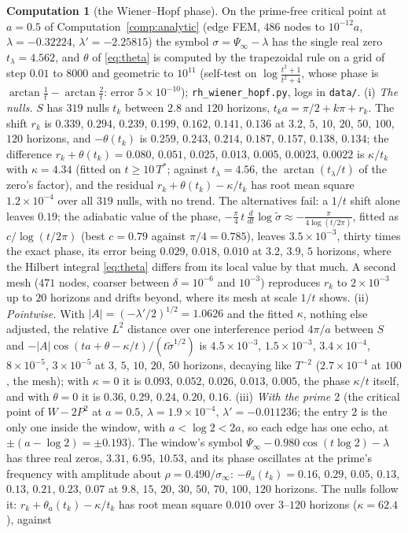 \documentclass[11pt]{article}
\theoremstyle{definition}
\newtheorem{computation}[theorem]{Computation}
\theoremstyle{remark}
\newcommand{\Tst}{T^{*}}
\begin{document}
\begin{computation}[the Wiener--Hopf phase]\label{comp:whphase}
On the prime-free critical point at $a=0.5$ of Computation~\ref{comp:analytic} (edge FEM, $486$ nodes to $10^{-12}a$, $\lambda=-0.32224$, $\lambda'=-2.25815$) the symbol $\sigma=\Psi_\infty-\lambda$ has the single real zero $t_\lambda=4.562$, and $\theta$ of \eqref{eq:theta} is computed by the trapezoidal rule on a grid of step $0.01$ to $8000$ and geometric to $10^{11}$ (self-test on $\log\frac{t^2+1}{t^2+4}$, whose phase is $\arctan\frac1t-\arctan\frac2t$: error $5\times10^{-10}$); \texttt{rh\_wiener\_hopf.py}, logs in \texttt{data/}. (i) \emph{The nulls.} $S$ has $319$ nulls $t_k$ between $2.8$ and $120$ horizons, $t_ka=\pi/2+k\pi+r_k$. The shift $r_k$ is $0.339$, $0.294$, $0.239$, $0.199$, $0.162$, $0.141$, $0.136$ at $3.2$, $5$, $10$, $20$, $50$, $100$, $120$ horizons, and $-\theta(t_k)$ is $0.259$, $0.243$, $0.214$, $0.187$, $0.157$, $0.138$, $0.134$; the difference $r_k+\theta(t_k)=0.080$, $0.051$, $0.025$, $0.013$, $0.005$, $0.0023$, $0.0022$ is $\kappa/t_k$ with $\kappa=4.34$ (fitted on $t\ge10\,\Tst$; against $t_\lambda=4.56$, the $\arctan(t_\lambda/t)$ of the zero's factor), and the residual $r_k+\theta(t_k)-\kappa/t_k$ has root mean square $1.2\times10^{-4}$ over all $319$ nulls, with no trend. The alternatives fail: a $1/t$ shift alone leaves $0.19$; the adiabatic value of the phase, $-\frac\pi4\,t\,\frac{d}{dt}\log\tilde\sigma\approx-\frac{\pi}{4\log(t/2\pi)}$, fitted as $c/\log(t/2\pi)$ (best $c=0.79$ against $\pi/4=0.785$), leaves $3.5\times10^{-3}$, thirty times the exact phase, its error being $0.029$, $0.018$, $0.010$ at $3.2$, $3.9$, $5$ horizons, where the Hilbert integral \eqref{eq:theta} differs from its local value by that much. A second mesh ($471$ nodes, coarser between $\delta=10^{-6}$ and $10^{-3}$) reproduces $r_k$ to $2\times10^{-3}$ up to $20$ horizons and drifts beyond, where its mesh at scale $1/t$ shows. (ii) \emph{Pointwise.} With $|A|=(-\lambda'/2)^{1/2}=1.0626$ and the fitted $\kappa$, nothing else adjusted, the relative $L^2$ distance over one interference period $4\pi/a$ between $S$ and $-|A|\cos(ta+\theta-\kappa/t)/(t\tilde\sigma^{1/2})$ is $4.5\times10^{-3}$, $1.5\times10^{-3}$, $3.4\times10^{-4}$, $8\times10^{-5}$, $3\times10^{-5}$ at $3$, $5$, $10$, $20$, $50$ horizons, decaying like $T^{-2}$ ($2.7\times10^{-4}$ at $100$, the mesh); with $\kappa=0$ it is $0.093$, $0.052$, $0.026$, $0.013$, $0.005$, the phase $\kappa/t$ itself, and with $\theta=0$ it is $0.36$, $0.29$, $0.24$, $0.20$, $0.16$. (iii) \emph{With the prime $2$} (the critical point of $W-2P^2$ at $a=0.5$, $\lambda=1.9\times10^{-4}$, $\lambda'=-0.011236$; the entry $2$ is the only one inside the window, with $a<\log2<2a$, so each edge has one echo, at $\pm(a-\log2)=\pm0.193$). The window's symbol $\Psi_\infty-0.980\cos(t\log2)-\lambda$ has three real zeros, $3.31$, $6.95$, $10.53$, and its phase oscillates at the prime's frequency with amplitude about $\rho=0.490/\sigma_\infty$: $-\theta_a(t_k)=0.16$, $0.29$, $0.05$, $0.13$, $0.13$, $0.21$, $0.23$, $0.07$ at $9.8$, $15$, $20$, $30$, $50$, $70$, $100$, $120$ horizons. The nulls follow it: $r_k+\theta_a(t_k)-\kappa/t_k$ has root mean square $0.010$ over $3$--$120$ horizons ($\kappa=62.4$), against 
\end{computation}
\end{document}

